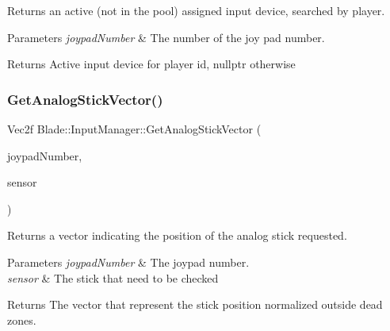 Returns an active (not in the pool) assigned input device, searched by player. 


\begin{DoxyParams}{Parameters}
{\em joypad\+Number} & The number of the joy pad number. \\
\hline
\end{DoxyParams}
\begin{DoxyReturn}{Returns}
Active input device for player id, nullptr otherwise 
\end{DoxyReturn}
\mbox{\label{class_blade_1_1_input_manager_ab41a4d4a8352903e18ba578316c36dc7}} 
\subsubsection{\texorpdfstring{Get\+Analog\+Stick\+Vector()}{GetAnalogStickVector()}}
{\footnotesize\ttfamily Vec2f Blade\+::\+Input\+Manager\+::\+Get\+Analog\+Stick\+Vector (\begin{DoxyParamCaption}\item[{Joypad\+Number}]{joypad\+Number,  }\item[{\hyperlink{namespace_blade_a1ecca198b7e0afbe43139ec2b0db937c}{Input\+Sensor}}]{sensor }\end{DoxyParamCaption})}



Returns a vector indicating the position of the analog stick requested. 


\begin{DoxyParams}{Parameters}
{\em joypad\+Number} & The joypad number. \\
\hline
{\em sensor} & The stick that need to be checked \\
\hline
\end{DoxyParams}
\begin{DoxyReturn}{Returns}
The vector that represent the stick position normalized outside dead zones. 
\end{DoxyReturn}
\mbox{\label{class_blade_1_1_input_manager_a979db0aea29e22ed95c2642649922a41}} 
